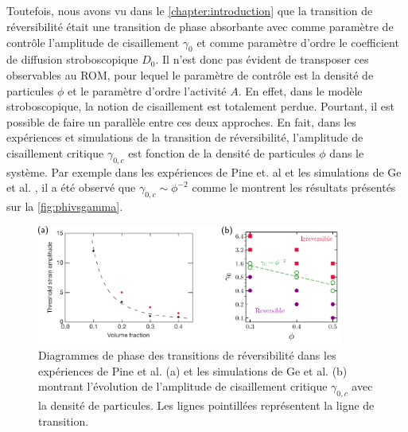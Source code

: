 \subparagraph{}Toutefois, nous avons vu dans le \autoref{chapter:introduction} que la transition de réversibilité était une transition de phase absorbante avec comme paramètre de contrôle l'amplitude de cisaillement $\gamma_0$ et comme paramètre d'ordre le coefficient de diffusion stroboscopique $D_0$. Il n'est donc pas évident de transposer ces observables au ROM, pour lequel le paramètre de contrôle est la densité de particules $\phi$  et le paramètre d'ordre l'activité $A$. En effet, dans le modèle stroboscopique, la notion de cisaillement est totalement perdue. Pourtant, il est possible de faire un parallèle entre ces deux approches. En fait, dans les expériences et simulations de la transition de réversibilité, l'amplitude de cisaillement critique $\gamma_{0,c}$ est fonction de la densité de particules $\phi$ dans le système. Par exemple dans les expériences de Pine et. al \cite{pine_chaos_2005} et les simulations de Ge et al. \cite{ge_rheology_2022}, il a été observé que $\gamma_{0,c}\sim \phi^{-2}$ comme le montrent les résultats présentés sur la \autoref{fig:phivsgamma}.

\begin{figure}[h]
	\centering
	\includegraphics[width=0.9\textwidth]{Chapitre3/Figures/Method/phivsgamma.pdf}
	\caption{Diagrammes de phase des transitions de réversibilité dans les expériences de Pine et al. \cite{pine_chaos_2005} (a) et les simulations de Ge et al. \cite{ge_rheology_2022} (b) montrant l'évolution de l'amplitude de cisaillement critique $\gamma_{0,c}$ avec la densité de particules. Les lignes pointillées représentent la ligne de transition.}
	\label{fig:phivsgamma}
\end{figure}

